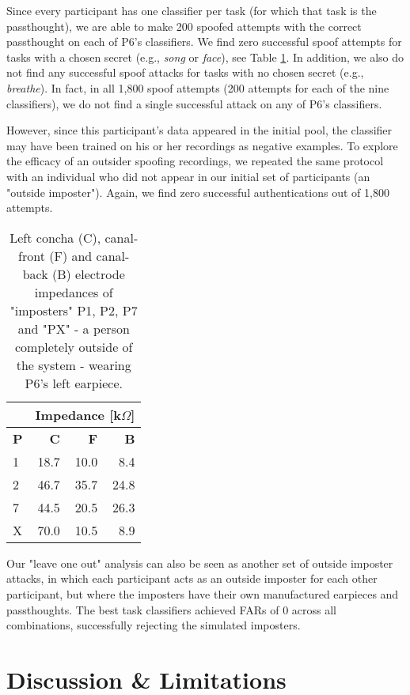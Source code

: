 \documentclass{sigchi}
\begin{document}
Since every participant has one classifier per task (for which that task is the passthought), we are able to make 200 spoofed attempts with the correct passthought on each of P6's classifiers. We find zero successful spoof attempts for tasks with a chosen secret (e.g., \textit{song} or \textit{face}), see Table \ref{tab:imposter_impedances}. In addition, we also do not find any successful spoof attacks for tasks with no chosen secret (e.g., \textit{breathe}). In fact, in all 1,800 spoof attempts (200 attempts for each of the nine classifiers), we do not find a single successful attack on any of P6's classifiers.

However, since this participant's data appeared in the initial pool, the classifier may have been trained on his or her recordings as negative examples. To explore the efficacy of an outsider spoofing recordings, we repeated the same protocol with an individual who did not appear in our initial set of participants (an "outside imposter"). Again, we find zero successful authentications out of 1,800 attempts.

\begin{table}[h]
\begin{center}
\begin{tabular}{lrrr}
& \multicolumn{3}{c}{Impedance [k\(\Omega\)]} \\
\hline
\textbf{P} & \textbf{C} & \textbf{F} & \textbf{B} \\
1 & 18.7 & 10.0 & 8.4\\
2 & 46.7 & 35.7 & 24.8\\
7 & 44.5 & 20.5 & 26.3\\
X & 70.0 & 10.5 & 8.9\\
\end{tabular}
\end{center}
\caption{Left concha (C), canal-front (F) and canal-back (B) electrode impedances of "imposters" P1, P2, P7 and "PX" - a person completely outside of the system - wearing P6's left earpiece.}
\label{tab:imposter_impedances}
\end{table}

Our "leave one out" analysis can also be seen as another set of outside imposter attacks, in which each participant acts as an outside imposter for each other participant, but where the imposters have their own manufactured earpieces and passthoughts. The best task classifiers achieved FARs of 0 across all combinations, successfully rejecting the simulated imposters.

\section{Discussion \& Limitations}
\end{document}

